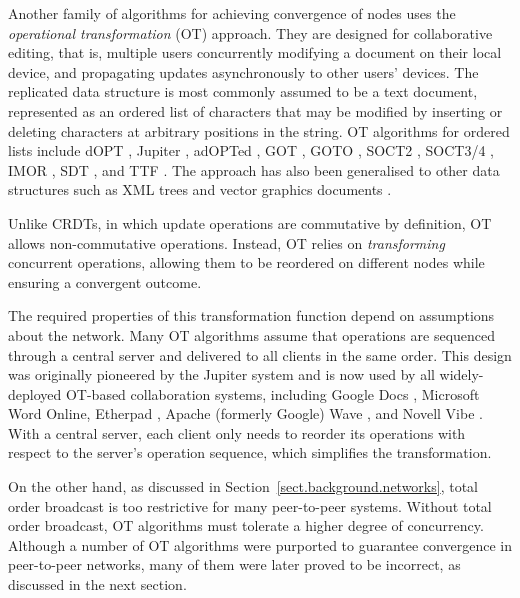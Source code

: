 Another family of algorithms for achieving convergence of nodes uses the \emph{operational
transformation} (OT) approach. They are designed for collaborative editing, that is, multiple users
concurrently modifying a document on their local device, and propagating updates asynchronously to
other users' devices. The replicated data structure is most commonly assumed to be a text document,
represented as an ordered list of characters that may be modified by inserting or deleting
characters at arbitrary positions in the string. OT algorithms for ordered lists include
dOPT \cite{Ellis:1989ue}, Jupiter \cite{Nichols:1995fd}, adOPTed \cite{Ressel:1996wx},
GOT \cite{Sun:1998un}, GOTO \cite{Sun:1998vf}, SOCT2 \cite{Suleiman:1997gl,Suleiman:1998eu},
SOCT3/4 \cite{Vidot:2000ch}, IMOR \cite{Imine:2003ks}, SDT \cite{Li:2004er,Li:2008hw}, and
TTF \cite{Oster:2006tr}.  The approach has also been generalised to other data structures such as
XML trees \cite{Ignat:2003jy,Davis:2002iv,Jungnickel:2015ua} and vector graphics documents
\cite{Sun:2002jb}.

Unlike CRDTs, in which update operations are commutative by definition, OT allows non-commutative
operations. Instead, OT relies on \emph{transforming} concurrent operations, allowing them to be
reordered on different nodes while ensuring a convergent outcome.

The required properties of this transformation function depend on assumptions about the network.
Many OT algorithms assume that operations are sequenced through a central server and delivered to
all clients in the same order. This design was originally pioneered by the Jupiter system
\cite{Nichols:1995fd} and is now used by all widely-deployed OT-based collaboration systems,
including Google Docs \cite{DayRichter:2010tt}, Microsoft Word Online, Etherpad
\cite{Etherpad:2011um}, Apache (formerly Google) Wave \cite{Wang:2015vo}, and Novell Vibe
\cite{Spiewak:2010vw}. With a central server, each client only needs to reorder its operations with
respect to the server's operation sequence, which simplifies the transformation.

On the other hand, as discussed in Section~\ref{sect.background.networks}, total order broadcast is
too restrictive for many peer-to-peer systems. Without total order broadcast, OT algorithms must
tolerate a higher degree of concurrency. Although a number of OT algorithms were purported to
guarantee convergence in peer-to-peer networks, many of them were later proved to be incorrect, as
discussed in the next section.

